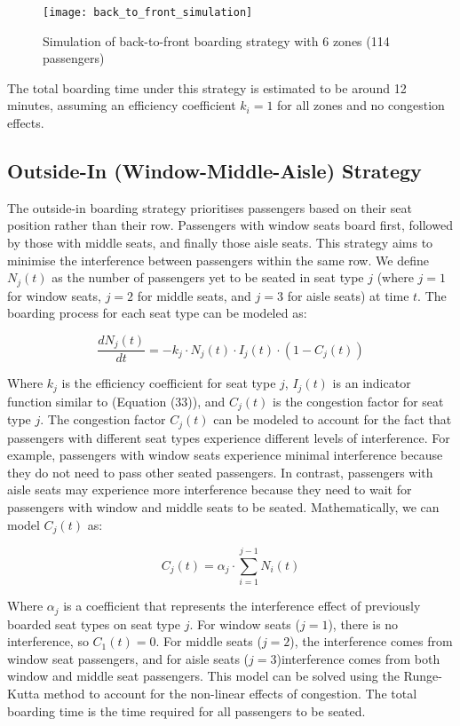 \documentclass[12pt]{article}
\begin{document}
\begin{figure}[h]
    \centering
    \texttt{[image: back\_to\_front\_simulation]}
    \caption{Simulation of back-to-front boarding strategy with 6 zones (114 passengers)}
    \label{fig:back_to_front_simulation}
\end{figure}

The total boarding time under this strategy is estimated to be around 12 minutes, assuming an efficiency coefficient $k_i = 1$ for all zones and no congestion effects.

\subsection{Outside-In (Window-Middle-Aisle) Strategy}

The outside-in boarding strategy prioritises passengers based on their seat position rather than their row. Passengers with window seats board first, followed by those with middle seats, and finally those aisle seats. This strategy aims to minimise the interference between passengers within the same row. We define $N_j(t)$ as the number of passengers yet to be seated in seat type $j$ (where $j = 1$ for window seats, $j = 2$ for middle seats, and $j = 3$ for aisle seats) at time $t$. The boarding process for each seat type can be modeled as:

\begin{equation}
\frac{dN_j(t)}{dt} = -k_j \cdot N_j(t) \cdot I_j(t) \cdot (1 - C_j(t))
\end{equation}

Where $k_j$ is the efficiency coefficient for seat type $j$, $I_j(t)$ is an indicator function similar to (Equation (33)), and $C_j(t)$ is the congestion factor for seat type $j$. The congestion factor $C_j(t)$ can be modeled to account for the fact that passengers with different seat types experience different levels of interference. For example, passengers with window seats experience minimal interference because they do not need to pass other seated passengers. In contrast, passengers with aisle seats may experience more interference because they need to wait for passengers with window and middle seats to be seated. Mathematically, we can model $C_j(t)$ as:

\begin{equation}
C_j(t) = \alpha_j \cdot \sum_{i=1}^{j-1} N_i(t)
\end{equation}

Where $\alpha_j$ is a coefficient that represents the interference effect of previously boarded seat types on seat type $j$. For window seats ($j = 1$), there is no interference, so $C_1(t) = 0$. For middle seats ($j = 2$), the interference comes from window seat passengers, and for aisle seats ($j = 3$)interference comes from both window and middle seat passengers. This model can be solved using the Runge-Kutta method to account for the non-linear effects of congestion. The total boarding time is the time required for all passengers to be seated.
\end{document}
